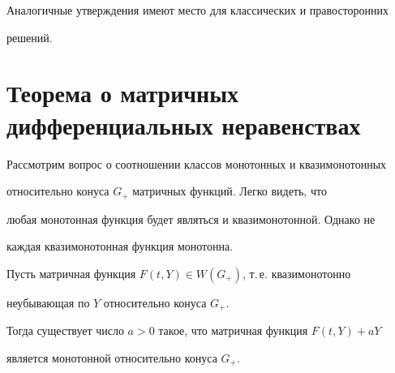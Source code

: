  


Аналогичные утверждения имеют место для классических и правосторонних 


решений. 


 


\section{Теорема о матричных дифференциальных неравенствах} 


 


Рассмотрим вопрос о соотношении классов монотонных и квазимонотонных 


относительно конуса $G_+$ матричных функций. Легко видеть, что 


любая монотонная функция будет являться и квазимонотонной. Однако не 


каждая квазимонотонная функция монотонна. 


 


\begin{lem} 


Пусть матричная функция $F(t,Y)\in W(G_+)$, т.\,е. квазимонотонно 


неубывающая по $Y$ относительно конуса $G_+$. 


Тогда существует число $a>0$ такое, что матричная функция $F(t,Y)+a Y$ 


является монотонной относительно конуса $G_+$. 


\end{lem} 


 


